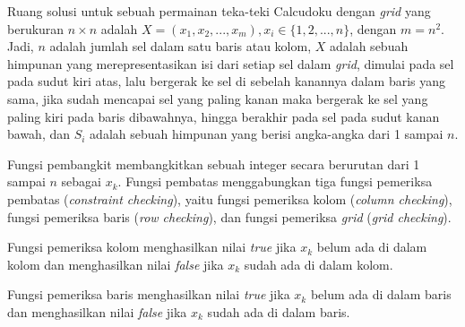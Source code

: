 Ruang solusi untuk sebuah permainan teka-teki Calcudoku dengan \textit{grid} yang berukuran \begin{math}n \times n\end{math} adalah \begin{math}X = (x_1,x_2,...,x_m), x_i \in \{1,2,...,n\}\end{math}, dengan \begin{math}m = n^2\end{math}. Jadi, \begin{math}n\end{math} adalah jumlah sel dalam satu baris atau kolom, \begin{math}X\end{math} adalah sebuah himpunan yang merepresentasikan isi dari setiap sel dalam \textit{grid}, dimulai pada sel pada sudut kiri atas, lalu bergerak ke sel di sebelah kanannya dalam baris yang sama, jika sudah mencapai sel yang paling kanan maka bergerak ke sel yang paling kiri pada baris dibawahnya, hingga berakhir pada sel pada sudut kanan bawah, dan \begin{math}S_i\end{math} adalah sebuah himpunan yang berisi angka-angka dari 1 sampai \begin{math}n\end{math}.

Fungsi pembangkit membangkitkan sebuah integer secara berurutan dari 1 sampai \begin{math}n\end{math} sebagai \begin{math}x_k\end{math}. Fungsi pembatas menggabungkan tiga fungsi pemeriksa pembatas (\textit{constraint checking}), yaitu fungsi pemeriksa kolom (\textit{column checking}), fungsi pemeriksa baris (\textit{row checking}), dan fungsi pemeriksa \textit{grid} (\textit{grid checking}).

Fungsi pemeriksa kolom menghasilkan nilai \textit{true} jika \begin{math}x_k\end{math} belum ada di dalam kolom dan menghasilkan nilai \textit{false} jika \begin{math}x_k\end{math} sudah ada di dalam kolom.

Fungsi pemeriksa baris menghasilkan nilai \textit{true} jika \begin{math}x_k\end{math} belum ada di dalam baris dan menghasilkan nilai \textit{false} jika \begin{math}x_k\end{math} sudah ada di dalam baris.

